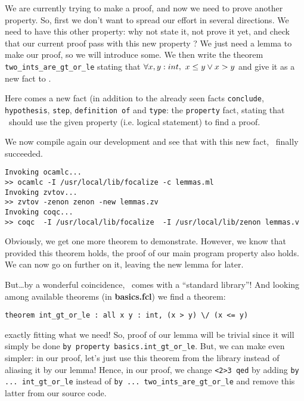 \documentclass[11pt,a4paper,twoside,onecolumn,fullpage]{article}
\begin{document}
\medskip
We are currently trying to make a proof, and now we need to prove
another property. So, first we don't want to spread our effort in
several directions. We need to have this other property: why not state
it, not prove it yet, and check that our current proof pass with this
new property ? We just need a lemma to make our proof, so we will
introduce some. We then write the theorem
\lstinline"two_ints_are_gt_or_le"
stating that $\forall x, y : int,\ x \le y \vee x > y$ and give it
as a new fact to \zenon.

Here comes a new fact  (in addition to the
already seen facts \lstinline"conclude", \lstinline"hypothesis",
\lstinline"step", \lstinline"definition of" and \lstinline"type": the
\lstinline"property" fact, sta\-ting that \zenon\ should use the given
property (i.e. logical statement) to find a proof.

{\scriptsize
}

We now compile again our development and see that with this new fact,
\zenon\ finally succeeded.

{\scriptsize
\begin{verbatim}
Invoking ocamlc...
>> ocamlc -I /usr/local/lib/focalize -c lemmas.ml
Invoking zvtov...
>> zvtov -zenon zenon -new lemmas.zv
Invoking coqc...
>> coqc  -I /usr/local/lib/focalize  -I /usr/local/lib/zenon lemmas.v
\end{verbatim}}

Obviously, we get one more theorem to demonstrate. However, we know
that provided this theorem holds, the proof of our main program
property also holds. We can now go on further on it, leaving the new
lemma for later.

But\ldots by a wonderful coincidence, \focal\ comes with a ``standard
library''! And looking among available theorems (in
\textbf{basics.fcl}) we find a theorem:

{\scriptsize
\begin{lstlisting}
theorem int_gt_or_le : all x y : int, (x > y) \/ (x <= y)
\end{lstlisting}}

\noindent exactly fitting what we need! So, proof of our lemma will be
trivial since it will simply be done \lstinline"by property basics.int_gt_or_le".
But, we can make even simpler: in our proof, let's just use this
theorem from the library instead of aliasing it by our lemma! Hence,
in our proof, we change \lstinline"<2>3 qed" by adding
\lstinline"by ... int_gt_or_le" instead of
\lstinline"by ... two_ints_are_gt_or_le" and remove this latter from
our source code.
\end{document}
